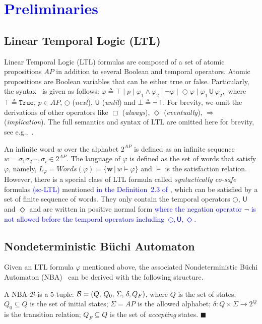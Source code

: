 \section{\textcolor{blue}{Preliminaries}}\label{sec:preliminary}
\subsection{Linear Temporal Logic (LTL)}\label{subsec:LTL}
Linear Temporal Logic (LTL) formulas are composed of a set of atomic propositions $AP$
in addition to several Boolean and temporal operators. Atomic propositions are Boolean variables that can
be either true or false.  Particularly, the syntax~\citep{baier2008principles} is given as follows:
$\varphi \triangleq \top \;|\; p  \;|\; \varphi_1 \wedge \varphi_2  \;|\; \neg \varphi  \;|\; \bigcirc \varphi  \;|\;  \varphi_1 \,\textsf{U}\, \varphi_2,$
where $\top\triangleq \texttt{True}$, $p \in AP$, $\bigcirc$ (\emph{next}),
$\textsf{U}$ (\emph{until}) and $\bot\triangleq \neg \top$.
For brevity, we omit the derivations of other operators like $\Box$ (\emph{always}),
 $\Diamond$ (\emph{eventually}), $\Rightarrow$ (\emph{implication}).
The full semantics and syntax of LTL are omitted here for brevity,
see e.g.,~\citep{baier2008principles}.

An infinite {word} $w$ over the alphabet $2^{AP}$ is defined as an
infinite sequence ${w}=\sigma_1\sigma_2\cdots, \sigma_i\in 2^{AP}$.
The language of $\varphi$ is defined as the set of words that satisfy $\varphi$,
namely, $L_\varphi=Words(\varphi)=\{\boldsymbol{w}\,|\,w\models\varphi\}$
and $\models$ is the satisfaction relation.
However, there is a special class of LTL formula called \emph{syntactically co-safe} formulas \textcolor{blue}{(sc-LTL)} mentioned \textcolor{blue}{in the Definition~2.3 of \citep{belta2017formal}},
which can be satisfied by a set of finite sequence of words.
They only contain the temporal operators $\bigcirc$, $\textsf{U}$ and $\Diamond$
 and are written in positive normal form \textcolor{blue}{where the negation
   operator $\neg$ is not allowed before the temporal
   operators including~$\bigcirc, \textsf{U}, \Diamond$.}

\subsection{Nondeterministic B\"uchi Automaton}\label{subsec:nba}

Given an LTL formula $\varphi$ mentioned above, the associated Nondeterministic B\"{u}chi Automaton (NBA)~\citep{baier2008principles} can be derived with the following structure.
\begin{definition}[NBA] \label{def:nba}
A NBA $\mathcal{B}$ is a 5-tuple: $\mathcal{B}=(Q,\,Q_0,\,\Sigma,\,\delta,\,\\Q_F)$,
where $Q$ is the set of states;
$Q_0\subseteq Q$ is the set of initial states;
$\Sigma=AP$ is the allowed alphabet;
$\delta:Q\times \Sigma\rightarrow2^{Q}$ is the transition relation;
$Q_F\subseteq Q$ is the set of \emph{accepting} states. \hfill $\blacksquare$
\end{definition}

